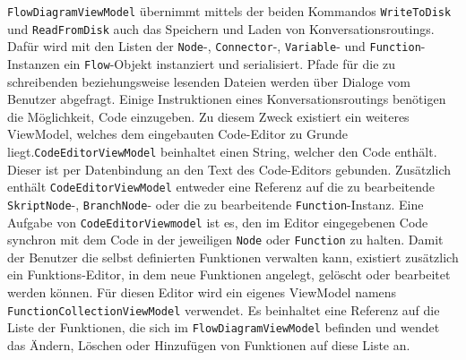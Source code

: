 \texttt{FlowDiagramViewModel} übernimmt mittels der beiden Kommandos \texttt{WriteToDisk} und \texttt{ReadFromDisk} auch das Speichern und Laden von Konversationsroutings. Dafür wird mit den Listen der \texttt{Node}-, \texttt{Connector}-, \texttt{Variable}- und \texttt{Function}-Instanzen ein \texttt{Flow}-Objekt instanziert und serialisiert. Pfade für die zu schreibenden beziehungsweise lesenden Dateien werden über Dialoge vom Benutzer abgefragt.
\newline
Einige Instruktionen eines Konversationsroutings benötigen die Möglichkeit, Code einzugeben. Zu diesem Zweck existiert ein weiteres ViewModel, welches dem eingebauten Code-Editor zu Grunde liegt.\texttt{CodeEditorViewModel} beinhaltet einen String, welcher den Code enthält. Dieser ist per Datenbindung an den Text des Code-Editors gebunden. Zusätzlich enthält \texttt{CodeEditorViewModel} entweder eine Referenz auf die zu bearbeitende \texttt{SkriptNode}-, \texttt{BranchNode}- oder die zu bearbeitende \texttt{Function}-Instanz. Eine Aufgabe von \texttt{CodeEditorViewmodel} ist es, den im Editor eingegebenen Code synchron mit dem Code in der jeweiligen \texttt{Node} oder \texttt{Function} zu halten. 
\newline
Damit der Benutzer die selbst definierten Funktionen verwalten kann, existiert zusätzlich ein Funktions-Editor, in dem neue Funktionen angelegt, gelöscht oder bearbeitet werden können. Für diesen Editor wird ein eigenes ViewModel namens \texttt{FunctionCollectionViewModel} verwendet. Es beinhaltet eine Referenz auf die Liste der Funktionen, die sich im \texttt{FlowDiagramViewModel} befinden und wendet das Ändern, Löschen oder Hinzufügen von Funktionen auf diese Liste an.

